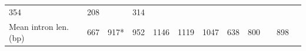\documentclass[]{elsarticle} %
\begin{document}
\begin{longtable}[]{@{}llllllllllll@{}}
\begin{minipage}[t]{0.05\columnwidth}
354\strut
\end{minipage} & \begin{minipage}[t]{0.05\columnwidth}\raggedright\strut
208\strut
\end{minipage} & \begin{minipage}[t]{0.05\columnwidth}\raggedright\strut
\strut
\end{minipage} & \begin{minipage}[t]{0.05\columnwidth}\raggedright\strut
314\strut
\end{minipage} & \begin{minipage}[t]{0.05\columnwidth}\raggedright\strut
\strut
\end{minipage}\tabularnewline
\begin{minipage}[t]{0.15\columnwidth}\raggedright\strut
Mean intron len. (bp)\strut
\end{minipage} & \begin{minipage}[t]{0.05\columnwidth}\raggedright\strut
667\strut
\end{minipage} & \begin{minipage}[t]{0.05\columnwidth}\raggedright\strut
917*\strut
\end{minipage} & \begin{minipage}[t]{0.05\columnwidth}\raggedright\strut
952\strut
\end{minipage} & \begin{minipage}[t]{0.05\columnwidth}\raggedright\strut
1146\strut
\end{minipage} & \begin{minipage}[t]{0.05\columnwidth}\raggedright\strut
1119\strut
\end{minipage} & \begin{minipage}[t]{0.05\columnwidth}\raggedright\strut
1047\strut
\end{minipage} & \begin{minipage}[t]{0.05\columnwidth}\raggedright\strut
638\strut
\end{minipage} & \begin{minipage}[t]{0.05\columnwidth}\raggedright\strut
800\strut
\end{minipage} & \begin{minipage}[t]{0.05\columnwidth}\raggedright\strut
\strut
\end{minipage} & \begin{minipage}[t]{0.05\columnwidth}\raggedright\strut
898\strut
\end{minipage} & \begin{minipage}[t]{0.05\columnwidth}\raggedright\strut

\end{minipage}
\end{longtable}
\end{document}
